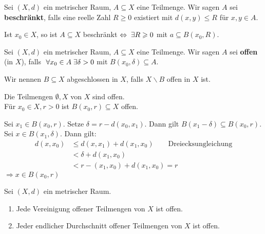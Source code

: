 \documentclass[main.tex]{subfiles}
\begin{document}
\begin{Definition}[Beschränktheit]
  Sei $(X,d)$ ein metrischer Raum, $A \subseteq X$ eine Teilmenge. Wir sagen $A$ sei \textbf{beschränkt}, falls eine reelle Zahl $R \geq 0$ existiert mit $d(x,y) \leq R$ für $x,y \in A$.
\end{Definition}

\begin{Bemerkung}
  Ist $x_0 \in X$, so ist $A \subseteq X$ beschränkt $\Leftrightarrow \;\exists R \geqslant 0$ mit $a \subseteq B(x_0,R)$.
\end{Bemerkung}

\begin{Definition}
  Sei $(X,d)$ ein metrischer Raum, $A \subseteq X$ eine Teilmenge. Wir sagen $A$ sei \textbf{offen} (in $X$), falls $\;\forall x_0 \in A \;\exists \delta > 0$ mit $B(x_0,\delta) \subseteq A$.

  Wir nennen $B \subseteq X$ abgeschlossen in $X$, falls $X \backslash B$ offen in $X$ ist.
\end{Definition}

\begin{Bemerkung}
  \begin{Theorem}
    Die Teilmengen $\emptyset,X$ von $X$ sind offen.\\
    Für $x_0 \in X, r> 0$ ist $B(x_0,r) \subseteq X$ offen.
  \end{Theorem}
  \begin{Beweis}
    Sei $x_1 \in B(x_0,r)$. Setze $\delta = r- d(x_0,x_1)$. Dann gilt $B(x_1 - \delta) \subseteq B(x_0,r)$.\\
    Sei $x\in B(x_1,\delta)$. Dann gilt:
    $$\begin{aligned}
        d(x,x_0) &\leq d(x,x_1) + d(x_1,x_0)\qquad\text{Dreiecksungleichung}\\
        &< \delta + d(x_1,x_0)\\
        &< r - (x_1,x_0) + d(x_1,x_0) = r
    \end{aligned}$$
    $\Rightarrow x \in B(x_0,r)$
  \end{Beweis}
\end{Bemerkung}

\begin{Theorem}
  Sei $(X,d)$ ein metrischer Raum.
  \begin{enumerate}
    \item Jede Vereinigung offener Teilmengen von $X$ ist offen.
    \item Jeder endlicher Durchschnitt offener Teilmengen von $X$ ist offen.
  \end{enumerate}
\end{Theorem}
\end{document}
